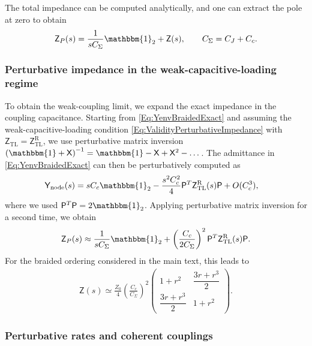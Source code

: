 \documentclass[prx,aps,twocolumn,article]{revtex4-2}
\newcommand{\msf}[1]{\mathsf{#1}}
\newcommand{\msY}{\msf{Y}}
\newcommand{\msZ}{\msf{Z}}
\newcommand{\msZTL}{\msZ_{\mathrm{TL}}}
\newcommand{\msYnode}{\msY_{\rm node}}
\newcommand{\msP}{\msf{P}}
\newcommand{\msX}{\msf{X}}
\newcommand{\msId}{\mathbbm{1}}
\begin{document}
The total impedance can be computed analytically, and one can extract the
pole at zero to obtain
\begin{align}
    \msZ_P(s)
    =
    \frac{1}{sC_\Sigma}\msId_2
    +
    \msZ(s),
    \qquad
    C_\Sigma=C_J+C_c.
    \label{Eq:BraidedZeroPole}
\end{align}


\subsubsection{Perturbative impedance in
the weak-capacitive-loading regime}

To obtain the weak-coupling limit, we expand the exact impedance in the
coupling capacitance. Starting from \cref{Eq:YenvBraidedExact} and assuming
the weak-capacitive-loading condition \cref{Eq:ValidityPerturbativeImpedance}
with $\msZTL=\msZ^{\mathrm R}_{\mathrm{TL}}$, we use perturbative matrix inversion $\left(
\msId+\msX\right)^{-1}  =  \msId-\msX+\msX^2-\dots $. The admittance in \cref{Eq:YenvBraidedExact} can then be perturbatively
computed as
\begin{align}
    \msYnode(s)
    &=
    sC_c\msId_2
    -
    \frac{s^2C_c^2}{4}
    \msP^T\msZTL^{\rm R}(s)\msP
    +
    O(C_c^3),
    \label{Eq:ApproxImpedanceEnv}
\end{align}
where we used $\msP^T\msP=2\msId_2$. Applying perturbative matrix inversion for a second time, we obtain
\begin{align}
    \msZ_P(s)
    \approx
    \frac{1}{sC_\Sigma}\msId_2
    + \left(
        \frac{C_c}{2C_\Sigma}
    \right)^2
    \msP^T\msZTL^{\rm R}(s)\msP.
\end{align}
For the braided ordering considered in the main text, this leads to
\begin{align}
    \msZ(s)
    \simeq
    \frac{Z_0}{4}
    \left(
        \frac{C_c}{C_\Sigma}
    \right)^2
    \begin{pmatrix}
        1+r^2
        &
        \dfrac{3r+r^3}{2}
        \\
        \dfrac{3r+r^3}{2}
        &
        1+r^2
    \end{pmatrix}.
    \label{Eq:ZregBraidedWeakMatrix}
\end{align}


\subsubsection{Perturbative rates and coherent couplings}
\end{document}
